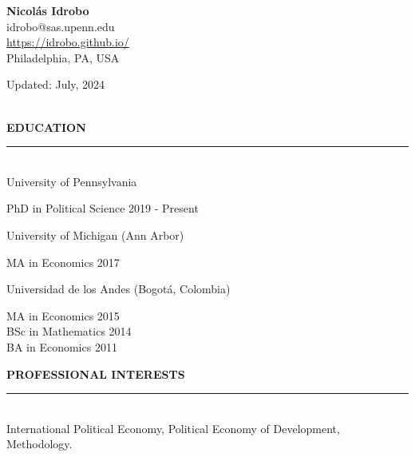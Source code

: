 \documentclass[10pt, english]{article}
\begin{document}
\begin{center}
\textbf{\large Nicol\'as Idrobo}\\
idrobo@sas.upenn.edu\\
\url{https://idrobo.github.io/}\\
Philadelphia, PA, USA
\end{center}

\begin{center}
Updated: July, 2024
\end{center}
\ \\
\textbf{EDUCATION}

\noindent\rule{\textwidth}{1pt}\\

University of Pennsylvania
\vspace{-0.25cm}
\begin{flushright}
\begin{minipage}{0.95\textwidth}
PhD in Political Science \hfill 2019 - Present\\
\end{minipage}
\end{flushright}

\vspace{-0.2cm}
University of Michigan (Ann Arbor)
\vspace{-0.25cm}
\begin{flushright}
\begin{minipage}{0.95\textwidth}
MA in Economics \hfill 2017\\
\end{minipage}
\end{flushright}

\vspace{-0.2cm}
Universidad de los Andes (Bogot\'a, Colombia)
\vspace{-0.25cm}
\begin{flushright}
\begin{minipage}{0.95\textwidth}
MA in Economics \hfill 2015\\
BSc in Mathematics \hfill  2014\\
BA in Economics \hfill 2011\\
\end{minipage}
\end{flushright}

\vspace{0.2cm}
\textbf{PROFESSIONAL INTERESTS}

\noindent\rule{\textwidth}{1pt}\\

International Political Economy, Political Economy of Development, Methodology.\\
\end{document}
